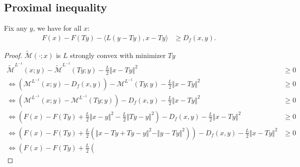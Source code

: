 \documentclass[12pt]{article}
\begin{document}
    \subsection{Proximal inequality}
    \begin{theorem}
        Fix any $y$, we have for all $x$: 
        \begin{align*}
            F(x) - F(Ty) - \langle L(y - Ty), x - Ty\rangle
            &\ge  D_f(x, y). 
        \end{align*}
    \end{theorem}
    \begin{proof}
        $\widetilde {\mathcal M}(\cdot; x)$ is $L$ strongly convex with minimizer $Ty$
        {\small
        \begin{align*}
            \widetilde{\mathcal M}^{L^{-1}}(x; y) - 
            \widetilde{\mathcal M}^{L^{-1}}(Ty; y)
            - 
            \frac{L}{2}\Vert x - Ty\Vert^2
            &\ge 
            0
            \\
            \iff
            \left(
                \mathcal M^{L^{-1}}(x; y) - D_f(x, y)
            \right) - 
            \mathcal M^{L^{-1}}(Ty; y) 
            - 
            \frac{L}{2}\Vert x - Ty\Vert^2
            &\ge 0
            \\
            \iff 
            \left(
                \mathcal M^{L^{-1}}(x; y)
                - 
                \mathcal M^{L^{-1}}(Ty; y)
            \right)
            - 
            D_f(x, y) 
            - \frac{L}{2}\Vert x - Ty\Vert^2
            &\ge 0
            \\
            \iff 
            \left(
                F(x) - F(Ty) 
                + 
                \frac{L}{2}\Vert x - y\Vert^2 - 
                \frac{L}{2}\Vert Ty - y\Vert^2
            \right)
            - 
            D_f(x, y) 
            - \frac{L}{2}\Vert x - Ty\Vert^2
            &\ge 0
            \\
            \iff 
            \left(
                F(x) - F(Ty) 
                + 
                \frac{L}{2}
                \left(
                    \Vert x - Ty + Ty - y\Vert^2
                    - 
                    \Vert y - Ty\Vert^2
                \right)
            \right)
            - 
            D_f(x, y) 
            - \frac{L}{2}\Vert x - Ty\Vert^2
            &\ge 0
            \\
            \iff 
            \left(
                F(x) - F(Ty) 
                + 
                \frac{L}{2}
                \left(

\end{align*}}
\end{proof}
\end{document}
